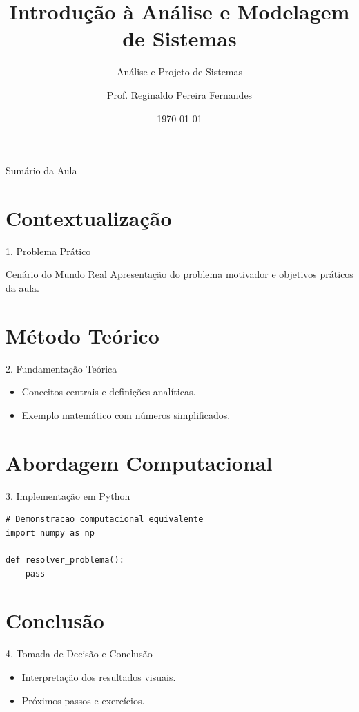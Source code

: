 \documentclass[10pt]{beamer}
\title[Aula 01 - Análise e Projeto de Sistemas]{Introdução à Análise e Modelagem de Sistemas}
\subtitle{Análise e Projeto de Sistemas}
\author[Prof. Reginaldo Fernandes]{Prof. Reginaldo Pereira Fernandes}
\institute[IFCE]{Instituto Federal do Cear\'a -- Campus Tau\'a \\ Técnico em Informática para Internet}
\date{\today}
\begin{document}
\begin{frame}
    \titlepage
\end{frame}

\begin{frame}{Sum\'ario da Aula}
    \tableofcontents
\end{frame}

\section{Contextualiza\c{c}\~ao}
\begin{frame}{1. Problema Pr\'atico}
    \begin{block}{Cen\'ario do Mundo Real}
        Apresenta\c{c}\~ao do problema motivador e objetivos pr\'aticos da aula.
    \end{block}
\end{frame}

\section{M\'etodo Te\'orico}
\begin{frame}{2. Fundamenta\c{c}\~ao Te\'orica}
    \begin{itemize}
        \item Conceitos centrais e defini\c{c}\~oes anal\'iticas.
        \item Exemplo matem\'atico com n\'umeros simplificados.
    \end{itemize}
\end{frame}

\section{Abordagem Computacional}
\begin{frame}[fragile]{3. Implementa\c{c}\~ao em Python}
\begin{lstlisting}
# Demonstracao computacional equivalente
import numpy as np

def resolver_problema():
    pass
\end{lstlisting}
\end{frame}

\section{Conclus\~ao}
\begin{frame}{4. Tomada de Decis\~ao e Conclus\~ao}
    \begin{itemize}
        \item Interpreta\c{c}\~ao dos resultados visuais.
        \item Pr\'oximos passos e exerc\'icios.
    \end{itemize}
\end{frame}
\end{document}
